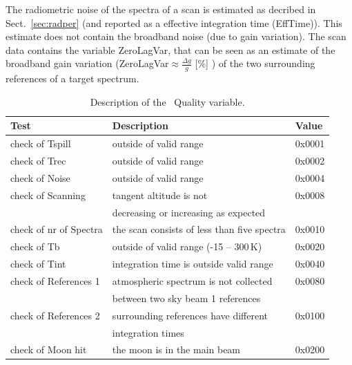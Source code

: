 The radiometric noise of the spectra of a scan is estimated as decribed  
in Sect.~\ref{sec:radper} (and reported as a effective integration time (EffTime)).
This estimate does not contain the broadband noise (due to gain variation). 
The scan data contains the variable ZeroLagVar, that can be seen as an estimate
of the broadband gain variation (ZeroLagVar\(\approx \frac{\Delta g}{g}\) [\%] ) 
of the two surrounding references of a target spectrum. 
 

\begin{table}
\caption{ Description of the \smr\ Quality variable. }
\label{table:quality}
\begin{tabular}{|l|l|l|}
  \hline
  \textbf{Test} & \textbf{Description} & \textbf{Value} \\
  \hline
  check of Tspill   & outside of valid range  & 0x0001 \\
  \hline
  check of Trec     & outside of valid range & 0x0002  \\
  \hline
  check of Noise    & outside of valid range & 0x0004  \\
  \hline
  check of Scanning & tangent altitude is not & 0x0008 \\
                    &  decreasing or increasing as expected &  \\
  \hline
  check of nr of Spectra &  the scan consists of less than five spectra & 0x0010\\
  \hline
  check of Tb       & outside of valid range (-15 -- 300\,K) & 0x0020\\ 
  \hline
  check of Tint     & integration time is outside valid range & 0x0040\\
  \hline
  check of References 1 & atmospheric spectrum is not collected & 0x0080\\
                        & between two sky beam 1 references     & \\
  \hline
  check of References 2 & surrounding references have different & 0x0100\\
                        & integration times                     & \\ 
  \hline check of Moon hit   & the moon is in the main beam          & 0x0200 \\

\hline
\end{tabular}
\end{table}


